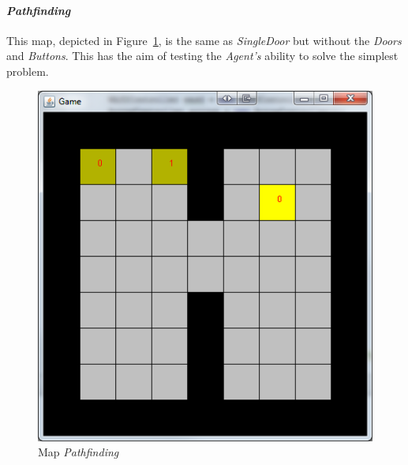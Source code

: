 \documentclass{IEEEtran}
\begin{document}
\paragraph{\emph{Pathfinding}} This map, depicted in Figure~\ref{Pathfinding}, is the same as \emph{SingleDoor} but without the \emph{Doors} and \emph{Buttons}. This has the aim of testing the \emph{Agent's} ability to solve the simplest problem.
\begin{figure}[!t]
\centering
\includegraphics[scale=0.35]{level1e}
\caption{Map \textit{Pathfinding}}
\label{Pathfinding}
\end{figure}
\end{document}
